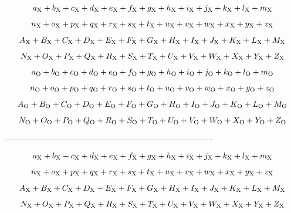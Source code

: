 

$$
a_{\rm X}+
b_{\rm X}+
c_{\rm X}+
d_{\rm X}+
e_{\rm X}+
f_{\rm X}+
g_{\rm X}+
h_{\rm X}+
i_{\rm X}+
j_{\rm X}+
k_{\rm X}+
l_{\rm X}+
m_{\rm X}
$$

$$n_{\rm X}+
o_{\rm X}+
p_{\rm X}+
q_{\rm X}+
r_{\rm X}+
s_{\rm X}+
t_{\rm X}+
u_{\rm X}+
v_{\rm X}+
w_{\rm X}+
x_{\rm X}+
y_{\rm X}+
z_{\rm X}
$$

$$
A_{\rm X}+
B_{\rm X}+
C_{\rm X}+
D_{\rm X}+
E_{\rm X}+
F_{\rm X}+
G_{\rm X}+
H_{\rm X}+
I_{\rm X}+
J_{\rm X}+
K_{\rm X}+
L_{\rm X}+
M_{\rm X}
$$

$$
N_{\rm X}+
O_{\rm X}+
P_{\rm X}+
Q_{\rm X}+
R_{\rm X}+
S_{\rm X}+
T_{\rm X}+
U_{\rm X}+
V_{\rm X}+
W_{\rm X}+
X_{\rm X}+
Y_{\rm X}+
Z_{\rm X}
$$


$$
a_{\rm O}+
b_{\rm O}+
c_{\rm O}+
d_{\rm O}+
e_{\rm O}+
f_{\rm O}+
g_{\rm O}+
h_{\rm O}+
i_{\rm O}+
j_{\rm O}+
k_{\rm O}+
l_{\rm O}+
m_{\rm O}
$$

$$
n_{\rm O}+
o_{\rm O}+
p_{\rm O}+
q_{\rm O}+
r_{\rm O}+
s_{\rm O}+
t_{\rm O}+
u_{\rm O}+
v_{\rm O}+
w_{\rm O}+
x_{\rm O}+
y_{\rm O}+
z_{\rm O}
$$

$$
A_{\rm O}+
B_{\rm O}+
C_{\rm O}+
D_{\rm O}+
E_{\rm O}+
F_{\rm O}+
G_{\rm O}+
H_{\rm O}+
I_{\rm O}+
J_{\rm O}+
K_{\rm O}+
L_{\rm O}+
M_{\rm O}
$$

$$
N_{\rm O}+
O_{\rm O}+
P_{\rm O}+
Q_{\rm O}+
R_{\rm O}+
S_{\rm O}+
T_{\rm O}+
U_{\rm O}+
V_{\rm O}+
W_{\rm O}+
X_{\rm O}+
Y_{\rm O}+
Z_{\rm O}
$$



%
---------------------------------------------------------------------------- 

$$
a_{\rm X}+
b_{\rm X}+
c_{\rm X}+
d_{\rm X}+
e_{\rm X}+
f_{\rm X}+
g_{\rm X}+
h_{\rm X}+
i_{\rm X}+
j_{\rm X}+
k_{\rm X}+
l_{\rm X}+
m_{\rm X}
$$

$$n_{\rm X}+
o_{\rm X}+
p_{\rm X}+
q_{\rm X}+
r_{\rm X}+
s_{\rm X}+
t_{\rm X}+
u_{\rm X}+
v_{\rm X}+
w_{\rm X}+
x_{\rm X}+
y_{\rm X}+
z_{\rm X}
$$

$$
A_{\rm X}+
B_{\rm X}+
C_{\rm X}+
D_{\rm X}+
E_{\rm X}+
F_{\rm X}+
G_{\rm X}+
H_{\rm X}+
I_{\rm X}+
J_{\rm X}+
K_{\rm X}+
L_{\rm X}+
M_{\rm X}
$$

$$
N_{\rm X}+
O_{\rm X}+
P_{\rm X}+
Q_{\rm X}+
R_{\rm X}+
S_{\rm X}+
T_{\rm X}+
U_{\rm X}+
V_{\rm X}+
W_{\rm X}+
X_{\rm X}+
Y_{\rm X}+
Z_{\rm X}
$$


